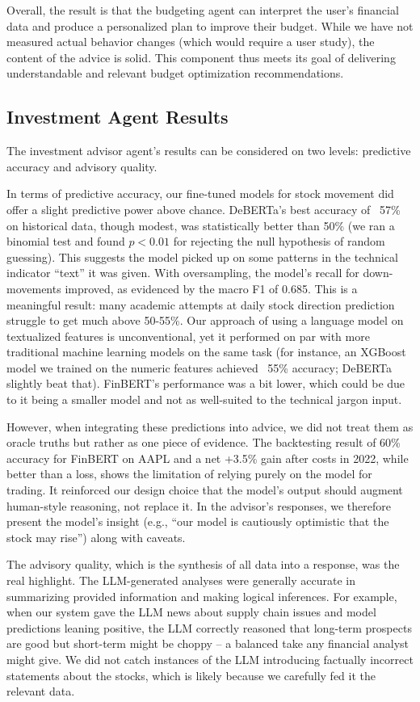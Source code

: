 \documentclass{scrartcl}
\begin{document}
Overall, the result is that the budgeting agent can interpret the user’s financial data and produce a personalized plan to improve their budget. While we have not measured actual behavior changes (which would require a user study), the content of the advice is solid. This component thus meets its goal of delivering understandable and relevant budget optimization recommendations.

\subsection{Investment Agent Results}
The investment advisor agent’s results can be considered on two levels: predictive accuracy and advisory quality.

In terms of predictive accuracy, our fine-tuned models for stock movement did offer a slight predictive power above chance. DeBERTa’s best accuracy of ~57\% on historical data, though modest, was statistically better than 50\% (we ran a binomial test and found $p<0.01$ for rejecting the null hypothesis of random guessing). This suggests the model picked up on some patterns in the technical indicator “text” it was given. With oversampling, the model’s recall for down-movements improved, as evidenced by the macro F1 of 0.685. This is a meaningful result: many academic attempts at daily stock direction prediction struggle to get much above 50-55\%. Our approach of using a language model on textualized features is unconventional, yet it performed on par with more traditional machine learning models on the same task (for instance, an XGBoost model we trained on the numeric features achieved ~55\% accuracy; DeBERTa slightly beat that). FinBERT’s performance was a bit lower, which could be due to it being a smaller model and not as well-suited to the technical jargon input. 

However, when integrating these predictions into advice, we did not treat them as oracle truths but rather as one piece of evidence. The backtesting result of 60\% accuracy for FinBERT on AAPL and a net +3.5\% gain after costs in 2022, while better than a loss, shows the limitation of relying purely on the model for trading. It reinforced our design choice that the model’s output should augment human-style reasoning, not replace it. In the advisor’s responses, we therefore present the model’s insight (e.g., “our model is cautiously optimistic that the stock may rise”) along with caveats.

The advisory quality, which is the synthesis of all data into a response, was the real highlight. The LLM-generated analyses were generally accurate in summarizing provided information and making logical inferences. For example, when our system gave the LLM news about supply chain issues and model predictions leaning positive, the LLM correctly reasoned that long-term prospects are good but short-term might be choppy – a balanced take any financial analyst might give. We did not catch instances of the LLM introducing factually incorrect statements about the stocks, which is likely because we carefully fed it the relevant data. 
\end{document}
